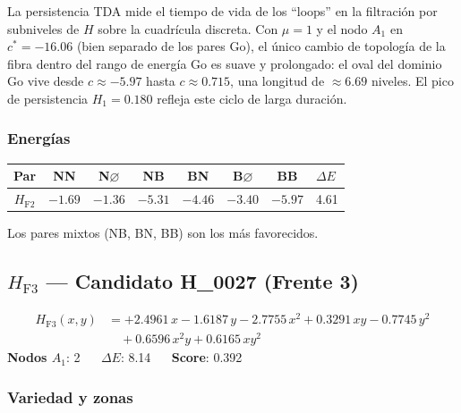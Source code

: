 \documentclass[11pt,a4paper]{article}
\newcommand{\dE}{\Delta E}
\begin{document}
La persistencia TDA mide el tiempo de vida de los ``loops'' en la
filtración por subniveles de $H$ sobre la cuadrícula discreta.
Con $\mu=1$ y el nodo $A_1$ en $c^*=-16.06$ (bien separado de los pares Go),
el único cambio de topología de la fibra dentro del rango de energía Go
es suave y prolongado: el oval del dominio Go vive desde $c\approx -5.97$
hasta $c\approx 0.715$, una longitud de $\approx 6.69$ niveles.
El pico de persistencia $H_1=0.180$ refleja este ciclo de larga duración.

\subsubsection*{Energías}

\begin{center}
\begin{tabular}{ccccccc}
  \toprule
  Par & NN & N$\varnothing$ & NB & BN & B$\varnothing$ & BB & $\dE$ \\
  \midrule
  $H_{\text{F2}}$ & $-1.69$ & $-1.36$ & $-5.31$ & $-4.46$ & $-3.40$ & $-5.97$ & 4.61 \\
  \bottomrule
\end{tabular}
\end{center}

Los pares mixtos (NB, BN, BB) son los más favorecidos.

\subsection{\texorpdfstring{$H_{\text{F3}}$}{H\_F3} --- Candidato H\_0027 (Frente 3)}

\begin{tcolorbox}[hambox,title={$H_{\text{F3}}$ (H\_0027, Frente 3) $\cdot$
  $H_1$-max = 0.0072 $\cdot$ Rob = 1.000}]
\begin{align*}
  H_{\text{F3}}(x,y) &=
    +2.4961\,x - 1.6187\,y
    - 2.7755\,x^2 + 0.3291\,xy - 0.7745\,y^2 \\
  &\quad + 0.6596\,x^2y + 0.6165\,xy^2
\end{align*}
\textbf{Nodos $A_1$}: 2 $\quad$
\textbf{$\dE$}: 8.14 $\quad$
\textbf{Score}: 0.392
\end{tcolorbox}

\subsubsection*{Variedad y zonas}
\end{document}
